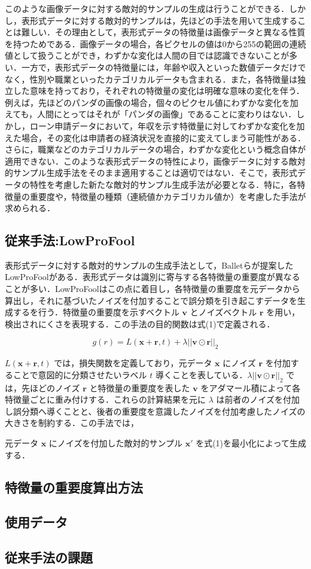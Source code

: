 このような画像データに対する敵対的サンプルの生成は行うことができる．しかし，表形式データに対する敵対的サンプルは，先ほどの手法を用いて生成することは難しい．その理由として，表形式データの特徴量は画像データと異なる性質を持つためである．画像データの場合，各ピクセルの値は0から255の範囲の連続値として扱うことができ，わずかな変化は人間の目では認識できないことが多い．一方で，表形式データの特徴量には，年齢や収入といった数値データだけでなく，性別や職業といったカテゴリカルデータも含まれる．また，各特徴量は独立した意味を持っており，それぞれの特徴量の変化は明確な意味の変化を伴う．例えば，先ほどのパンダの画像の場合，個々のピクセル値にわずかな変化を加えても，人間にとってはそれが「パンダの画像」であることに変わりはない．しかし，ローン申請データにおいて，年収を示す特徴量に対してわずかな変化を加えた場合，その変化は申請者の経済状況を直接的に変えてしまう可能性がある．さらに，職業などのカテゴリカルデータの場合，わずかな変化という概念自体が適用できない．このような表形式データの特性により，画像データに対する敵対的サンプル生成手法をそのまま適用することは適切ではない．そこで，表形式データの特性を考慮した新たな敵対的サンプル生成手法が必要となる．特に，各特徴量の重要度や，特徴量の種類（連続値かカテゴリカル値か）を考慮した手法が求められる．

\subsection{従来手法:LowProFool}
表形式データに対する敵対的サンプルの生成手法として，Balletらが提案したLowProFool\cite{ballet2019imperceptible}がある．表形式データは識別に寄与する各特徴量の重要度が異なることが多い．LowProFoolはこの点に着目し，各特徴量の重要度を元データから算出し，それに基づいたノイズを付加することで誤分類を引き起こすデータを生成するを行う．特徴量の重要度を示すベクトル $\bm{v}$ とノイズベクトル $\bm{r}$ を用い，検出されにくさを表現する．この手法の目的関数は式(1)で定義される．

\begin{equation}
g(r) = L(\bm{x}+\bm{r}, t) + \lambda ||\bm{v} \odot \bm{r}||_2 \tag{1}
\end{equation}

 $L(\bm{x}+\bm{r}, t)$ では，損失関数を定義しており，元データ $\bm{x}$ にノイズ $\bm{r}$ を付加することで意図的に分類させたいラベル $t$ 導くことを表している．$\lambda ||\bm{v} \odot \bm{r}||_2$ では，先ほどのノイズ $\bm{r}$ と特徴量の重要度を表した $\bm{v}$ をアダマール積によって各特徴量ごとに重み付けする．これらの計算結果を元に $\lambda$ は前者のノイズを付加し誤分類へ導くことと、後者の重要度を意識したノイズを付加考慮したノイズの大きさを制約する．この手法では，

元データ $\bm{x}$ にノイズを付加した敵対的サンプル $\bm{x}'$ を式(1)を最小化によって生成する．

\subsection{特徴量の重要度算出方法}

\subsection{使用データ}

\subsection{従来手法の課題}